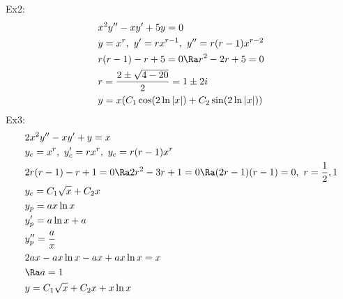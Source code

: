 Ex2:
\begin{align*}
    &x^2y''-xy'+5y=0\\
    &y=x^r,\ y'=rx^{r-1},\ y''=r(r-1)x^{r-2}\\
    &r(r-1)-r+5=0\Ra r^2-2r+5=0\\
    &r=\frac{2\pm\sqrt{4-20}}{2}=1\pm2i\\
    &y=x(C_1\cos(2\ln|x|)+C_2\sin(2\ln|x|))
\end{align*}
Ex3:
\begin{align*}
    &2x^2y''-xy'+y=x\\
    &y_c=x^r,\ y_c'=rx^r,\ y_c=r(r-1)x^r\\
    &2r(r-1)-r+1=0\Ra 2r^2-3r+1=0\Ra (2r-1)(r-1)=0,\ r=\frac{1}{2},1\\
    &y_c=C_1\sqrt{x}+C_2x\\
    &y_p=ax\ln x\\
    &y_p'=a\ln x+a\\
    &y_p''=\frac{a}{x}\\
    &2ax-ax\ln x-ax+ax\ln x=x\\
    &\Ra a=1\\
    &y=C_1\sqrt{x}+C_2x+x\ln x
\end{align*}